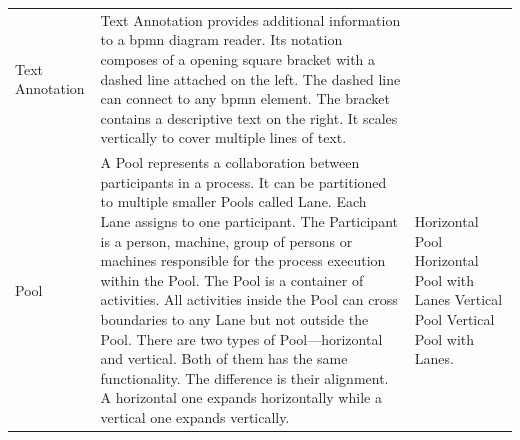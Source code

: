 \begin{longtable}{C{0.2\textwidth} L{0.45\textwidth} C{0.3\textwidth}}
	Text Annotation &
	Text Annotation provides additional information to a \gls{bpmn} diagram reader.
	Its notation composes of a opening square bracket with a dashed line attached on the left.
	The dashed line can connect to any \gls{bpmn} element.
	The bracket contains a descriptive text on the right.
	It scales vertically to cover multiple lines of text.
	&
	 \\
	
	Pool &
	A Pool represents a collaboration between participants in a process.
	It can be partitioned to multiple smaller Pools called Lane.
	Each Lane assigns to one participant.
	The Participant is a person, machine, group of persons or machines responsible for the process execution within the Pool.
	The Pool is a container of activities.
	All activities inside the Pool can cross boundaries to any Lane but not outside the Pool.
	There are two types of Pool---horizontal and vertical.
	Both of them has the same functionality.
	The difference is their alignment.
	A horizontal one expands horizontally while a vertical one expands vertically.
	
	&
	Horizontal Pool
	Horizontal Pool with Lanes
	Vertical Pool
	Vertical Pool with Lanes. \\
	
	\hline

\end{longtable}

